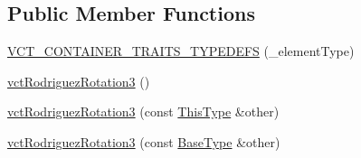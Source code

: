 \subsection*{Public Member Functions}
\begin{DoxyCompactItemize}
\item 
\hyperlink{classvct_rodriguez_rotation3_a86c5c86fe5004b192d12ff055a9e9988}{V\+C\+T\+\_\+\+C\+O\+N\+T\+A\+I\+N\+E\+R\+\_\+\+T\+R\+A\+I\+T\+S\+\_\+\+T\+Y\+P\+E\+D\+E\+F\+S} (\+\_\+element\+Type)
\item 
\hyperlink{classvct_rodriguez_rotation3_ab90c65541c05e3d783e268baf27dd5fe}{vct\+Rodriguez\+Rotation3} ()
\item 
\hyperlink{classvct_rodriguez_rotation3_a58058554210923e3a3925edfa9bf0f7a}{vct\+Rodriguez\+Rotation3} (const \hyperlink{classvct_fixed_size_const_vector_base_a071063bc4fa43112cc287b2dbef53180}{This\+Type} \&other)
\item 
\hyperlink{classvct_rodriguez_rotation3_ad9ca29e5e8e49ffcce8d7af44e812c6d}{vct\+Rodriguez\+Rotation3} (const \hyperlink{classvct_rodriguez_rotation3_a9808e8703a58127607921c08914bda40}{Base\+Type} \&other)
\end{DoxyCompactItemize}

